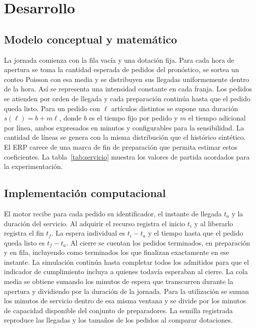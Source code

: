 \section{Desarrollo}
\subsection{Modelo conceptual y matemático}
La jornada comienza con la fila vacía y una dotación fija.
Para cada hora de apertura se toma la cantidad esperada de pedidos del pronóstico, se sortea un conteo Poisson con esa media y se distribuyen sus llegadas uniformemente dentro de la hora.
Así se representa una intensidad constante en cada franja.
Los pedidos se atienden por orden de llegada y cada preparación continúa hasta que el pedido queda listo.
Para un pedido con $\ell$ artículos distintos se supone una duración $s(\ell)=b+m\ell$, donde $b$ es el tiempo fijo por pedido y $m$ el tiempo adicional por línea, ambos expresados en minutos y configurables para la sensibilidad.
La cantidad de líneas se genera con la misma distribución que el histórico sintético.
El ERP carece de una marca de fin de preparación que permita estimar estos coeficientes.
La tabla~\ref{tab:servicio} muestra los valores de partida acordados para la experimentación.

\subsection{Implementación computacional}
El motor recibe para cada pedido su identificador, el instante de llegada $t_a$ y la duración del servicio.
Al adquirir el recurso registra el inicio $t_i$ y al liberarlo registra el fin $t_f$.
La espera individual es $t_i-t_a$ y el tiempo hasta que el pedido queda listo es $t_f-t_a$.
Al cierre se cuentan los pedidos terminados, en preparación y en fila, incluyendo como terminados los que finalizan exactamente en ese instante.
La simulación continúa hasta completar todos los admitidos para que el indicador de cumplimiento incluya a quienes todavía esperaban al cierre.
La cola media se obtiene sumando los minutos de espera que transcurren durante la apertura y dividiendo por la duración de la jornada.
Para la utilización se suman los minutos de servicio dentro de esa misma ventana y se divide por los minutos de capacidad disponible del conjunto de preparadores.
La semilla registrada reproduce las llegadas y los tamaños de los pedidos al comparar dotaciones.
